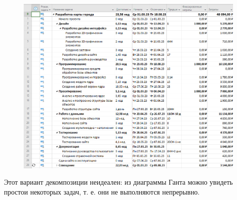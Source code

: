 \begin{figure}[H]
	\begin{center}
		\includegraphics[width=\textwidth]{imgs/task_3_2.png}
	\end{center}
\end{figure}

Этот вариант декомпозиции неидеален: из диаграммы Ганта можно увидеть простои некоторых задач, т. е. они не выполняются непрерывно.